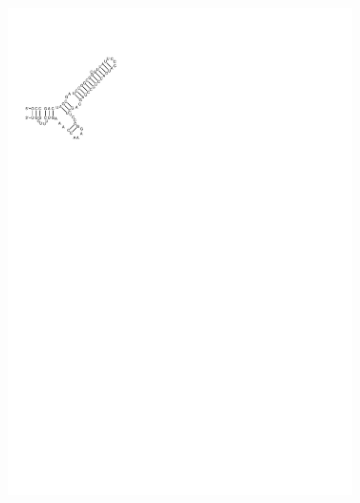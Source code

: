 \begin{figure}[t!H]
  \centering
  \begin{subfigure}[t]{0.3\textwidth}
    \includegraphics[clip, trim=1cm 21cm 14cm 2.5cm, width=1\textwidth]{../img/alg/insert/3/multibranch-beg}
    \caption{}
    \label{obr:delete_insert_multibranch_loop_a}
  \end{subfigure}
  \begin{subfigure}[t]{0.3\textwidth}

\end{subfigure}
\end{figure}
